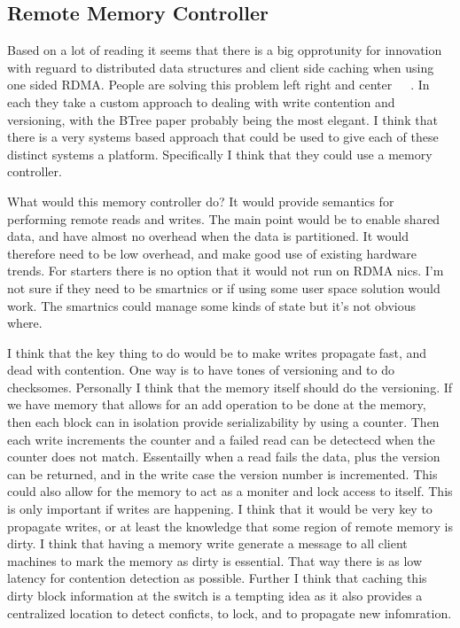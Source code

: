 \subsection{Remote Memory Controller}

Based on a lot of reading it seems that there is a big opprotunity for
innovation with reguard to distributed data structures and client side
caching when using one sided RDMA. People are solving this problem left right
and center~\cite{cell}~\cite{serf}~\cite{aguilera2019designing}. In each they
take a custom approach to dealing with write contention and versioning, with
the BTree paper probably being the most elegant. I think that there is a very
systems based approach that could be used to give each of these distinct
systems a platform. Specifically I think that they could use a memory
controller.

What would this memory controller do? It would provide semantics for
performing remote reads and writes. The main point would be to enable shared
data, and have almost no overhead when the data is partitioned. It would
therefore need to be low overhead, and make good use of existing hardware
trends. For starters there is no option that it would not run on RDMA nics.
I'm not sure if they need to be smartnics or if using some user space
solution would work. The smartnics could manage some kinds of state but it's
not obvious where.

I think that the key thing to do would be to make writes propagate fast, and
dead with contention. One way is to have tones of versioning and to do
checksomes. Personally I think that the memory itself should do the
versioning. If we have memory that allows for an add operation to be done at
the memory, then each block can in isolation provide serializability by using
a counter. Then each write increments the counter and a failed read can be
detectecd when the counter does not match. Essentailly when a read fails the
data, plus the version can be returned, and in the write case the version
number is incremented. This could also allow for the memory to act as a
moniter and lock access to itself. This is only important if writes are
happening. I think that it would be very key to propagate writes, or at least
the knowledge that some region of remote memory is dirty. I think that having
a memory write generate a message to all client machines to mark the memory
as dirty is essential. That way there is as low latency for contention
detection as possible. Further I think that caching this dirty block
information at the switch is a tempting idea as it also provides a
centralized location to detect conficts, to lock, and to propagate new
infomration.

